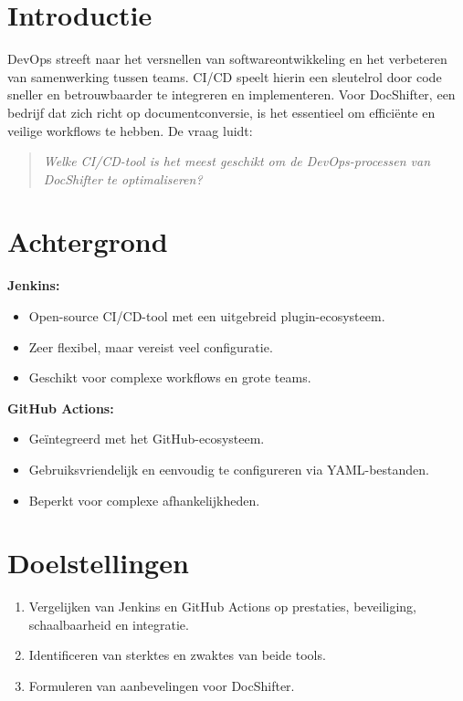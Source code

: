 \documentclass[a0,portrait]{hogent-poster}
\begin{document}
    \begin{multicols}{2}
        
        \section*{Introductie}
        DevOps streeft naar het versnellen van softwareontwikkeling en het verbeteren van samenwerking tussen teams. CI/CD speelt hierin een sleutelrol door code sneller en betrouwbaarder te integreren en implementeren. Voor DocShifter, een bedrijf dat zich richt op documentconversie, is het essentieel om efficiënte en veilige workflows te hebben. De vraag luidt:
        \begin{quote}
            \textit{Welke CI/CD-tool is het meest geschikt om de DevOps-processen van DocShifter te optimaliseren?}
        \end{quote}
        
        \section*{Achtergrond}
        \textbf{Jenkins:}
        \begin{itemize}
            \item Open-source CI/CD-tool met een uitgebreid plugin-ecosysteem.
            \item Zeer flexibel, maar vereist veel configuratie.
            \item Geschikt voor complexe workflows en grote teams.
        \end{itemize}
        \textbf{GitHub Actions:}
        \begin{itemize}
            \item Geïntegreerd met het GitHub-ecosysteem.
            \item Gebruiksvriendelijk en eenvoudig te configureren via YAML-bestanden.
            \item Beperkt voor complexe afhankelijkheden.
        \end{itemize}
        
        \section*{Doelstellingen}
        
        \begin{enumerate}
            \item Vergelijken van Jenkins en GitHub Actions op prestaties, beveiliging, schaalbaarheid en integratie.
            \item Identificeren van sterktes en zwaktes van beide tools.
            \item Formuleren van aanbevelingen voor DocShifter.
        \end{enumerate}


\end{multicols}
\end{document}
